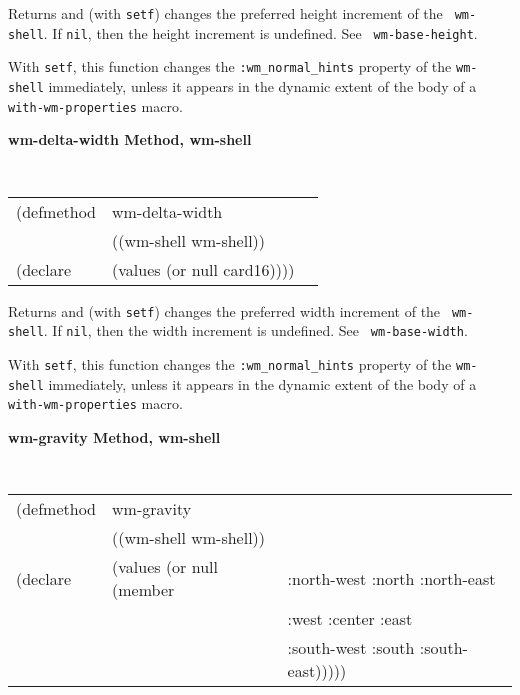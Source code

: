 \begin{flushright} \parbox[t]{6.125in}{
Returns and (with {\tt setf}) changes the preferred height increment of the {\tt
wm-shell}. If {\tt nil}, then the height increment is undefined. See {\tt
wm-base-height}.

With {\tt setf}, this function changes the {\tt :wm\_normal\_hints} property of
the {\tt wm-shell} immediately, unless it appears in the dynamic extent of the
body of a {\tt with-wm-properties} macro.

}\end{flushright}

{\samepage
{\large {\bf wm-delta-width \hfill Method, wm-shell}}
\begin{flushright} \parbox[t]{6.125in}{
\tt
\begin{tabular}{lll}
\raggedright
(defmethod & wm-delta-width & \\
           & ((wm-shell  wm-shell)) \\
(declare   & (values (or null card16))))
\end{tabular}
\rm

}\end{flushright}}

\begin{flushright} \parbox[t]{6.125in}{
Returns and (with {\tt setf}) changes the preferred width increment of the {\tt
wm-shell}. If {\tt nil}, then the width increment is undefined. See {\tt
wm-base-width}.

With {\tt setf}, this function changes the {\tt :wm\_normal\_hints} property of
the {\tt wm-shell} immediately, unless it appears in the dynamic extent of the
body of a {\tt with-wm-properties} macro.

}\end{flushright}


{\samepage
{\large {\bf wm-gravity \hfill Method, wm-shell}}
\begin{flushright} \parbox[t]{6.125in}{
\tt
\begin{tabular}{lll}
\raggedright
(defmethod & wm-gravity & \\
           & ((wm-shell  wm-shell)) \\
(declare   & (values (or null (member & :north-west :north :north-east\\ 
                                     && :west :center :east \\
                                     && :south-west :south :south-east)))))\\
\end{tabular} 
\rm

}\end{flushright}}

